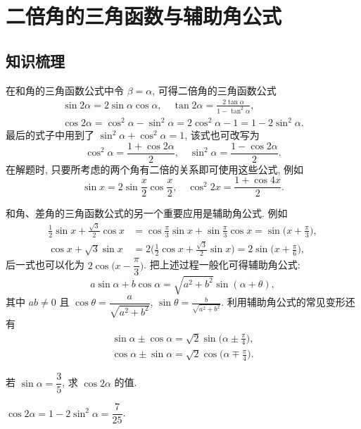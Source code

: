 
\section{二倍角的三角函数与辅助角公式}

\subsection{知识梳理}
在和角的三角函数公式中令 $\beta=\alpha$, 可得二倍角的三角函数公式
\begin{gather*}
    \sin2\alpha= 2\sin\alpha\cos\alpha, \quad
    \tan2\alpha= \frac{2\tan\alpha}{1- \tan^2\alpha},\\
    \cos2\alpha= \cos^2\alpha- \sin^2\alpha= 2\cos^2\alpha- 1= 1- 2\sin^2\alpha.
\end{gather*}
最后的式子中用到了 $\sin^2\alpha+\cos^2\alpha=1$, 该式也可改写为
\[\cos^2 \alpha= \frac{1+\cos2\alpha}2,\quad 
    \sin^2 \alpha= \frac{1-\cos2\alpha}2.\]
在解题时, 只要所考虑的两个角有二倍的关系即可使用这些公式, 例如
\[\sin x= 2\sin\frac{x}2\cos\frac{x}2,\quad
    \cos^2 2x= \frac{1+\cos4x}2.\]
    
和角、差角的三角函数公式的另一个重要应用是辅助角公式. 例如
\begin{align*}
    \frac12\sin x+\frac{\sqrt3}2\cos x
    &= \cos\frac{\pi}3\sin x+\sin\frac{\pi}3\cos x
     = \sin\Big(x+\frac{\pi}3\Big),                       \\
    \cos x+\sqrt3\sin x
    &= 2\Big(\frac12\cos x+\frac{\sqrt3}2\sin x\Big)
     = 2\sin\Big(x+\frac{\pi}6\Big),
\end{align*}
后一式也可以化为 $2\cos\Big(x-\dfrac{\pi}3\Big)$. 
把上述过程一般化可得辅助角公式: 
\[a\sin\alpha+ b\cos\alpha= \sqrt{a^2+ b^2}\sin(\alpha+ \theta),\]
其中 $ab\neq 0$ 且 $\cos\theta= \dfrac{a}{\sqrt{a^2+ b^2}}$,
$\sin\theta= \frac{b}{\sqrt{a^2+ b^2}}$. 利用辅助角公式的常见变形还有
\[\begin{gathered}
    \sin\alpha\pm\cos\alpha
    = \sqrt2\sin\biggl(\alpha\pm\frac\pi4\biggr),\\
    \cos\alpha\pm\sin\alpha
    = \sqrt2\cos\biggl(\alpha\mp\frac\pi4\biggr).
\end{gathered}\]

\lianxi

\begin{exercise}
    若 $\sin \alpha=\dfrac35$, 求 $\cos 2\alpha$ 的值.
\end{exercise}
\beginsolution
    $\cos 2\alpha= 1-2\sin^2\alpha= \dfrac7{25}$.
\endsolution


